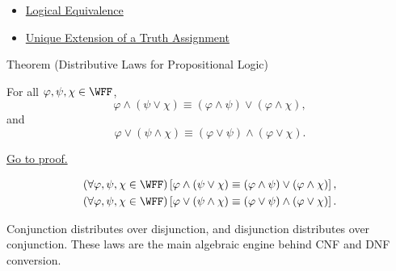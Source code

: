 \begin{dependencies}
\begin{itemize}
  \item \hyperref[def:logical-equivalence-propositional-logic]{Logical Equivalence}
  \item \hyperref[thm:unique-extension-truth-assignment-propositional-logic]{Unique Extension of a Truth Assignment}
\end{itemize}
\end{dependencies}
\begin{theorembox}{Theorem (Distributive Laws for Propositional Logic)}
\begin{theorem}
\label{thm:distributive-laws-propositional-logic}
For all \(\varphi,\psi,\chi\in\WFF\),
\[
\varphi\land(\psi\lor\chi)
\equiv
(\varphi\land\psi)\lor(\varphi\land\chi),
\]
and
\[
\varphi\lor(\psi\land\chi)
\equiv
(\varphi\lor\psi)\land(\varphi\lor\chi).
\]

\noindent\hyperref[prf:distributive-laws-propositional-logic]{Go to proof.}
\end{theorem}
\end{theorembox}

\begin{remark*}
\[
\begin{gathered}
(\forall\varphi,\psi,\chi\in\WFF)
\left[
\varphi\land(\psi\lor\chi)
\equiv
(\varphi\land\psi)\lor(\varphi\land\chi)
\right],\\
(\forall\varphi,\psi,\chi\in\WFF)
\left[
\varphi\lor(\psi\land\chi)
\equiv
(\varphi\lor\psi)\land(\varphi\lor\chi)
\right].
\end{gathered}
\]
\end{remark*}

\begin{remark*}[Interpretation]
Conjunction distributes over disjunction, and disjunction distributes over conjunction. These laws are the main algebraic engine behind CNF and DNF conversion.
\end{remark*}

